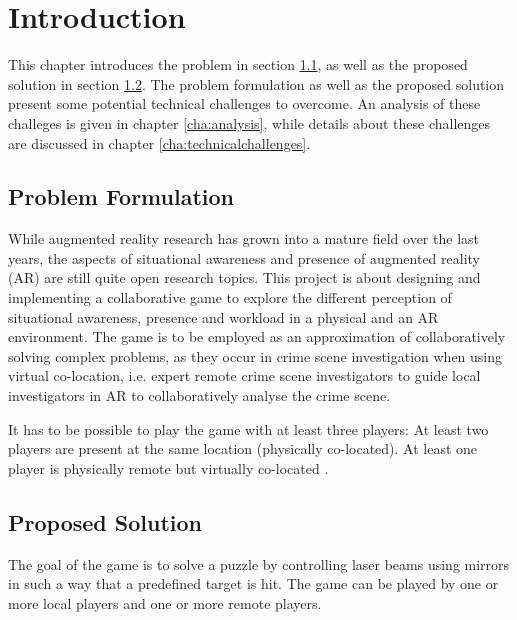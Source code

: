 \chapter{Introduction} \label{cha:introduction}
	This chapter introduces the problem in section \ref{sec:problem}, as well as
	the proposed solution in section \ref{sec:solution}. The problem formulation
	as well as the proposed solution present some potential technical challenges 
	to overcome. An analysis of these challeges is given in chapter 
	\ref{cha:analysis}, while details about these challenges are discussed in 
	chapter \ref{cha:technicalchallenges}.

	\section{Problem Formulation} \label{sec:problem}
		While augmented reality research has grown into a mature field over the 
		last years, the aspects of situational awareness and presence of 
		augmented reality (AR) are still quite open research topics. This 
		project is about designing and implementing a collaborative game to 
		explore the different perception of situational awareness, presence and 
		workload in a physical and an AR environment. The game is to be employed 
		as an approximation of collaboratively solving complex problems, as they 
		occur in crime scene investigation when using virtual co-location, i.e. 
		expert remote crime scene investigators to guide local investigators in 
		AR to collaboratively analyse the crime scene. 
		
		It has to be possible to play the game with at least three players: At 
		least two players are present at the same location (physically 
		co-located). At least one player is physically remote but virtually 
		co-located \cite{bepsys}.
	
	\section{Proposed Solution} \label{sec:solution}
		The goal of the game is to solve a puzzle by controlling laser beams 
		using mirrors in such a way that a predefined target is hit. The game 
		can be played by one or more local players and one or more remote players.
		
